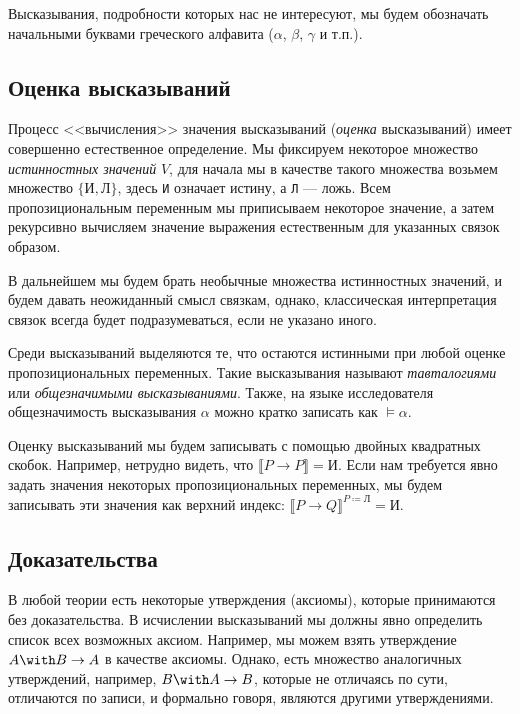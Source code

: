 Высказывания, подробности
которых нас не интересуют, мы будем обозначать начальными буквами греческого алфавита
($\alpha$, $\beta$, $\gamma$ и т.п.).

\subsection{Оценка высказываний}

Процесс <<вычисления>> значения высказываний (\emph{оценка} высказываний) имеет совершенно
естественное определение. Мы фиксируем некоторое множество
\emph{истинностных значений} $V$, для начала мы в качестве такого множества возьмем 
множество $\{\texttt{И}, \texttt{Л}\}$, здесь \texttt{И} означает истину, а
\texttt{Л} --- ложь. Всем пропозициональным переменным мы приписываем некоторое
значение, а затем рекурсивно вычисляем значение выражения естественным для указанных
связок образом.

В дальнейшем мы будем брать необычные множества истинностных значений, и будем давать
неожиданный смысл связкам, однако, классическая интерпретация связок всегда будет
подразумеваться, если не указано иного.

Среди высказываний выделяются те, что остаются истинными при любой оценке пропозициональных
переменных. Такие высказывания называют \emph{тавталогиями} или \emph{общезначимыми высказываниями}.
Также, на языке исследователя общезначимость высказывания $\alpha$ можно кратко 
записать как $\models \alpha$. 

Оценку высказываний мы будем записывать с помощью двойных квадратных скобок. Например,
нетрудно видеть, что $\llbracket P \rightarrow P \rrbracket = \texttt{И}$.
Если нам требуется явно задать значения некоторых пропозициональных переменных, мы будем
записывать эти значения как верхний индекс: $\llbracket P \rightarrow Q \rrbracket ^ {P\coloneqq \texttt{Л}} = \texttt{И}$.

\subsection{Доказательства}

В любой теории есть некоторые утверждения (аксиомы), которые принимаются без доказательства.
В исчислении высказываний мы должны явно определить список всех возможных аксиом. 
Например, мы можем взять утверждение $A \with B \rightarrow A$ в качестве аксиомы.
Однако, есть множество аналогичных утверждений, например, $B \with A \rightarrow B$,
которые не отличаясь по сути, отличаются по записи, и формально говоря, являются другими
утверждениями.

